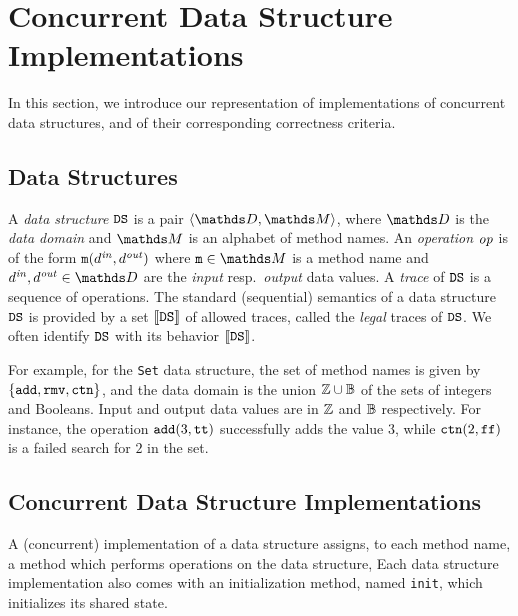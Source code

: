 \section{Concurrent Data Structure Implementations}
\label{programs:section}

In this section, we introduce our representation of implementations of
concurrent data structures, and of their corresponding correctness criteria.

\subsection{Data Structures}
A {\it data structure} ${\tt DS}$ is a pair
$\tuple{\ddomain,\malphabet}$,
where $\ddomain$ is the {\it data domain} and 
$\malphabet$ is an alphabet of method names.
%
An {\it operation} 
${\it op}$ is of the form
${\tt m}(d^{\it in},d^{\it out})$ where 
$\mname\in\malphabet$ is a method name and 
$\indata,\outdata\in\ddomain$ are the {\it input} resp.\ {\it output}
data values.
%
A {\it trace} of ${\tt DS}$ is a sequence of operations.
The standard (sequential) semantics of a data structure ${\tt DS}$ is provided by
a set $\left\llbracket{{\tt DS}}\right\rrbracket$ of allowed traces,
called the {\it legal} traces of ${\tt DS}$.
%
We often identify ${\tt DS}$ with its behavior $\left\llbracket{{\tt DS}}\right\rrbracket$.

For example, for the {\tt Set} data structure, the set of method names
is given by $\left\{{\tt add}, {\tt rmv}, {\tt ctn}\right\}$,
and the data domain is the  union ${\mathbb Z}\cup\mathbb{B}$
of the sets of integers and Booleans.
%
Input and output data values are in ${\mathbb Z}$ and $\mathbb{B}$
respectively.
%
For instance, the operation ${\tt add}(3,{\tt tt})$ successfully adds the value
$3$, while ${\tt ctn}(2,{\tt ff})$ is a failed search
for $2$ in the set.
%



\subsection{Concurrent Data Structure Implementations}
A (concurrent) implementation of a data structure assigns, to each
method name, a method which performs operations
%
on the data structure,
Each data structure implementation also comes with an initialization method,
named {\tt init}, which initializes its shared state.

